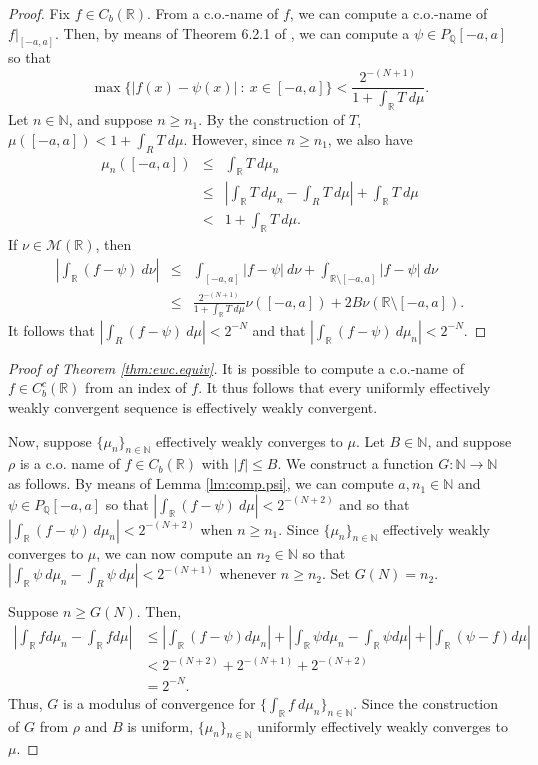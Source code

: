 \documentclass{amsart}
\newcommand{\Q}{\mathbb{Q}}
\newcommand{\R}{\mathbb{R}}
\newcommand{\N}{\mathbb{N}}
\newcommand{\M}{\mathcal{M}}
\theoremstyle{definition}
\numberwithin{equation}{section}
\begin{document}
\begin{proof}
Fix $f \in C_b(\R)$.  From a c.o.-name of $f$, we can compute a c.o.-name of $f|_{[-a,a]}$.  Then, by means of Theorem 6.2.1 of \cite{Weihrauch.2000}, we can compute a $\psi \in P_\Q[-a,a]$ so that 
\[
\max\{|f(x) - \psi(x)|\ :\ x \in [-a,a]\} < \frac{2^{-(N+1)}}{1 + \int_\R T\ d\mu}.
\]
Let $n \in \N$, and suppose $n \geq n_1$.  By the construction of $T$, $\mu([-a,a]) < 1 + \int_R T\ d\mu$. However, 
since $n \geq n_1$, we also have
\begin{eqnarray*}
\mu_n([-a,a]) & \leq & \int_\R T\ d\mu_n\\
& \leq & \left|\int_\R T\ d\mu_n - \int_R T\ d\mu\right| + \int_\R T\ d\mu\\
& < & 1 + \int_\R T\ d\mu.
\end{eqnarray*}
If $\nu \in \M(\R)$, then 
\begin{eqnarray*}
\left| \int_\R (f - \psi)\ d\nu\right| & \leq & \int_{[-a,a]} |f - \psi|\ d\nu + \int_{\R\setminus [-a,a]} |f - \psi|\ d\nu\\
& \leq & \frac{2^{-(N+1)}}{1 + \int_\R T\ d\mu} \nu([-a,a]) + 2B \nu(\R\setminus [-a,a]).
\end{eqnarray*}
It follows that $|\int_R(f -\psi)\ d\mu| < 2^{-N}$ and that 
$|\int_\R (f - \psi)\ d\mu_n| < 2^{-N}$.
\end{proof}

\begin{proof}[Proof of Theorem \ref{thm:ewc.equiv}]
It is possible to compute a c.o.-name of $f \in C^c_b(\R)$ from an index of $f$.  It thus follows that 
every uniformly effectively weakly convergent sequence is effectively weakly convergent.

Now, suppose $\{\mu_n\}_{n\in\N}$ effectively weakly converges to $\mu$.  Let $B \in\N$, and suppose $\rho$ is a c.o. name of $f\in C_b(\R)$ with $|f|\leq B$.  We construct a function $G: \N \rightarrow \N$ as follows.
By means of Lemma \ref{lm:comp.psi}, we can compute $a, n_1 \in \N$ and $\psi \in P_\Q[-a,a]$ so that 
$|\int_\R (f - \psi)\ d\mu| < 2^{-(N+2)}$ and so that $|\int_\R (f - \psi)\ d\mu_n| < 2^{-(N+2)}$ when $n \geq n_1$.
Since $\{\mu_n\}_{n\in\N}$ effectively weakly converges to $\mu$, we can now compute an $n_2 \in \N$ so that 
$|\int_\R \psi\ d\mu_n - \int_R \psi\ d\mu| < 2^{-(N+1)}$ whenever $n \geq n_2$.  Set $G(N) = n_2$.

Suppose $n \geq G( N)$.  Then, 
\begin{align*}
\left|\int_{\R}fd\mu_n-\int_{\R}fd\mu\right|&\leq\left|\int_{\R}(f-\psi)d\mu_n\right|+\left|\int_{\R}\psi d\mu_n-\int_{\R}\psi d\mu\right|+\left|\int_{\R}(\psi-f)d\mu\right|\\
&<2^{-(N+2)}+2^{-(N+1)}+2^{-(N+2)}\\
&=2^{-N}.
\end{align*}
Thus, $G$ is a modulus of convergence for $\{\int_\R f\ d\mu_n\}_{n \in \N}$.   Since the construction of $G$ from $\rho$ and $B$ is uniform, $\{\mu_n\}_{n \in \N}$ uniformly effectively weakly converges to $\mu$.
\end{proof}
\end{document}
